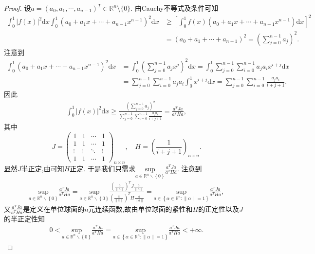 \documentclass[../../main.tex]{subfiles}%
\begin{document}
\begin{proof}
设$a=(a_0,a_1,\cdots,a_{n-1})^T\in\mathbb{R}^n\setminus\{0\}$. 由Cauchy不等式及条件可知
\begin{align*}
\int_0^1 |f(x)|^2\mathrm{d}x \int_0^1 (a_0 + a_1x + \cdots + a_{n-1}x^{n-1})^2\mathrm{d}x &\geqslant \left[ \int_0^1 f(x)(a_0 + a_1x + \cdots + a_{n-1}x^{n-1})\mathrm{d}x \right]^2 \\
&= (a_0 + a_1 + \cdots + a_{n-1})^2 = \left( \sum_{j=0}^{n-1}a_j \right)^2.
\end{align*}
注意到
\begin{align*}
\int_0^1 (a_0 + a_1x + \cdots + a_{n-1}x^{n-1})^2\mathrm{d}x &= \int_0^1 \left( \sum_{j=0}^{n-1}a_jx^j \right)^2\mathrm{d}x = \int_0^1 \sum_{j=0}^{n-1}\sum_{i=0}^{n-1}a_ja_ix^{i+j}\mathrm{d}x \\
&= \sum_{j=0}^{n-1}\sum_{i=0}^{n-1}a_ja_i \int_0^1 x^{i+j}\mathrm{d}x = \sum_{j=0}^{n-1}\sum_{i=0}^{n-1}\frac{a_ja_i}{i+j+1}.
\end{align*}
因此
\begin{align*}
\int_0^1 |f(x)|^2\mathrm{d}x \geqslant \frac{\left( \sum\limits_{j=0}^{n-1}a_j \right)^2}{\sum\limits_{j=0}^{n-1}\sum\limits_{i=0}^{n-1}\frac{a_ja_i}{i+j+1}} = \frac{a^TJa}{a^THa},
\end{align*}
其中
$$
J=\begin{pmatrix}1 & 1 & \cdots & 1 \\ 1 & 1 & \cdots & 1 \\ \vdots & \vdots & \ddots & \vdots \\ 1 & 1 & \cdots & 1\end{pmatrix}_{n\times n},\quad H=\left( \frac{1}{i+j+1} \right)_{n\times n}.
$$
显然$J$半正定,由可知$H$正定. 于是我们只需求$\underset{a\in \mathbb{R} ^n\backslash \left\{ 0 \right\}}{\mathrm{sup}}\frac{a^TJa}{a^THa}$. 注意到
\begin{align*}
\underset{a\in \mathbb{R} ^n\backslash \left\{ 0 \right\}}{\mathrm{sup}}\frac{a^TJa}{a^THa}=\underset{a\in \mathbb{R} ^n\backslash \left\{ 0 \right\}}{\mathrm{sup}}\frac{\left( \frac{a}{\left\| a \right\|} \right) ^TJ\frac{a}{\left\| a \right\|}}{\left( \frac{a}{\left\| a \right\|} \right) ^TH\frac{a}{\left\| a \right\|}}=\underset{a\in \left\{ \alpha \in \mathbb{R} ^n:\left\| \alpha \right\| =1 \right\}}{\mathrm{sup}}\frac{a^TJa}{a^THa},
\end{align*}
又$\frac{a^TJa}{a^THa}$是定义在单位球面的$n$元连续函数,故由单位球面的紧性和$H$的正定性以及$J$的半正定性知
\begin{align*}
0< \underset{a\in \mathbb{R} ^n\backslash \left\{ 0 \right\}}{\mathrm{sup}}\frac{a^TJa}{a^THa}=\underset{a\in \left\{ \alpha \in \mathbb{R} ^n:\left\| \alpha \right\| =1 \right\}}{\mathrm{sup}}\frac{a^TJa}{a^THa}<+\infty .

\end{align*}
\end{proof}
\end{document}
